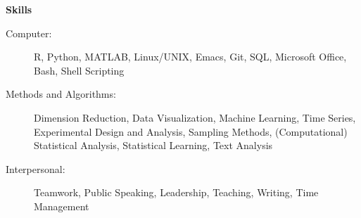\documentclass[letterpaper,11pt]{article}
\newcommand{\resheading}[1]{\colorbox{resBlue}{\begin{minipage}{\textwidth}
			\textbf{#1}
\end{minipage}} \vspace{-14pt}}
\begin{document}
\begin{itemize}
\end{itemize}

\resheading{Skills}
\begin{description}
	\item[Computer:] 
	{\footnotesize R, Python, MATLAB, Linux/UNIX, Emacs, Git, SQL, Microsoft Office, Bash, Shell Scripting} \vspace{-3pt}
	\item[Methods and Algorithms:] 
	{\footnotesize Dimension Reduction, Data Visualization, Machine Learning, Time Series, Experimental Design and Analysis, Sampling Methods, (Computational) Statistical Analysis, Statistical Learning, Text Analysis}  \vspace{-3pt}
	\begin{comment}{\footnotesize Regression (Logistic, GAM, Mixed Models), PCA, Factor Analysis, LDA, SVM, Simulated Annealing, MCMC, Boosting, Random Forests, SARIMA, GARCH, Graphical Models, Dimension Reduction, Model Regularization, Visualization, Experimental Design, Sampling Theory, Statistical Process Analysis, KNN, EM Algorithm, Text Processing} \end{comment}
	\item[Interpersonal:] 
	{\footnotesize Teamwork, Public Speaking, Leadership, Teaching, Writing, Time Management}
\end{description}
\end{document}
